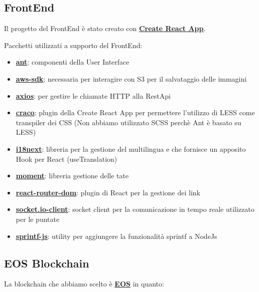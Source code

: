 \clearpage

\subsection{FrontEnd}
Il progetto del FrontEnd è stato creato con \textbf{\underline{\href{https://create-react-app.dev/}{Create React App}}}.

Pacchetti utilizzati a supporto del FrontEnd:

\begin{itemize}
	\item \textbf{\underline{\href{https://ant.design/}{ant}}}: componenti della User Interface
	\item \textbf{\underline{\href{https://www.npmjs.com/package/aws-sdk}{aws-sdk}}}: necessaria per interagire con S3 per il salvataggio delle immagini
	\item \textbf{\underline{\href{https://www.npmjs.com/package/axios}{axios}}}: per gestire le chiamate HTTP alla RestApi
	\item \textbf{\underline{\href{https://ant.design/docs/react/use-with-create-react-app}{craco}}}: plugin della Create React App per permettere l'utilizzo di LESS come transpiler dei CSS (Non abbiamo utilizzato SCSS perchè Ant è basato su LESS)
	\item \textbf{\underline{\href{https://react.i18next.com/latest/using-with-hooks}{i18next}}}: libreria per la gestione del multilingua e che fornisce un apposito Hook per React (useTranslation)
	\item \textbf{\underline{\href{https://momentjs.com}{moment}}}: libreria gestione delle tate
	\item \textbf{\underline{\href{https://reactrouter.com/web/guides/quick-start}{react-router-dom}}}: plugin di React per la gestione dei link
	\item \textbf{\underline{\href{https://www.npmjs.com/package/socket.io-client}{socket.io-client}}}: socket client per la comunicazione in tempo reale utilizzato per le puntate
	\item \textbf{\underline{\href{https://www.npmjs.com/package/sprintf-js}{sprintf-js}}}: utility per aggiungere la funzionalità sprintf a NodeJs
\end{itemize}

\clearpage

\subsection{EOS Blockchain}
La blockchain che abbiamo scelto è \textbf{\underline{\href{https://eos.io/}{EOS}}} in quanto: 


